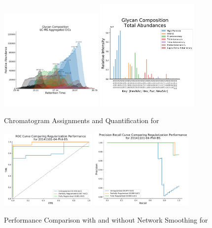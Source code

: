     \begin{figure}[h]
        \caption{Chromatogram Assignments and Quantification
                 for \philbs\label{fig:philbs_assignments}}
        \centering
        \includegraphics[width=0.45\textwidth,valign=t]{figure/phil_bs_chromatograms.pdf}
        \includegraphics[width=0.45\textwidth,valign=t]{figure/phil_bs_abundances.pdf}
    \end{figure}

\begin{figure}[h]
    \caption{Performance Comparison with and without Network Smoothing for \philbs
             \label{fig:philbs_perf}}
    \centering
    \includegraphics[width=0.42\textwidth,valign=t]{figure/phil_bs_native_roc.pdf}
    \includegraphics[width=0.45\textwidth,valign=t]{figure/phil_bs_native_prec_rec.pdf}
\end{figure}
